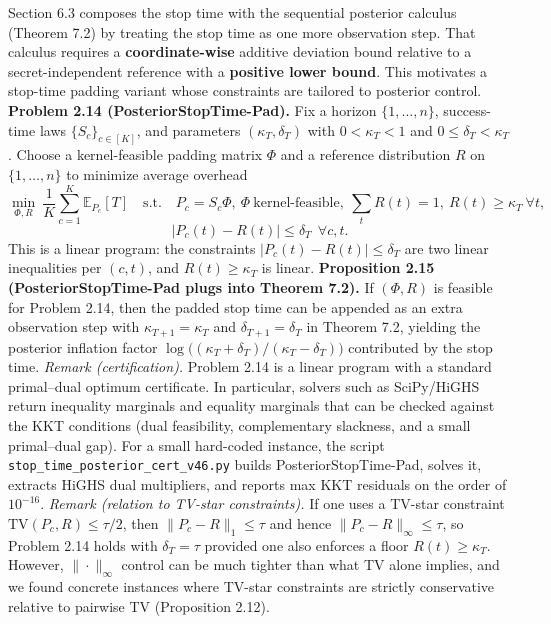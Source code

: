 \documentclass[11pt]{article}
\begin{document}
Section 6.3 composes the stop time with the sequential posterior
calculus (Theorem 7.2) by treating the stop time as one more observation
step. That calculus requires a \textbf{coordinate-wise} additive
deviation bound relative to a secret-independent reference with a
\textbf{positive lower bound}. This motivates a stop-time padding
variant whose constraints are tailored to posterior control.
\textbf{Problem 2.14 (PosteriorStopTime-Pad).} Fix a horizon
\(\{1,\dots,n\}\), success-time laws \(\{S_c\}_{c\in[K]}\), and
parameters \((\kappa_T,\delta_T)\) with \(0<\kappa_T<1\) and
\(0\le \delta_T<\kappa_T\). Choose a kernel-feasible padding matrix
\(\Phi\) and a reference distribution \(R\) on \(\{1,\dots,n\}\) to
minimize average overhead \[
\min_{\Phi,R}\ \frac1K\sum_{c=1}^K \mathbb{E}_{P_c}[T]
\quad\text{s.t.}\quad
P_c = S_c\Phi,\ \Phi\ \text{kernel-feasible},\ \sum_t R(t)=1,\ R(t)\ge \kappa_T\ \forall t,
\] \[
|P_c(t)-R(t)|\le \delta_T\ \ \forall c,t.
\] This is a linear program: the constraints
\(|P_c(t)-R(t)|\le \delta_T\) are two linear inequalities per \((c,t)\),
and \(R(t)\ge \kappa_T\) is linear. \textbf{Proposition 2.15
(PosteriorStopTime-Pad plugs into Theorem 7.2).} If \((\Phi,R)\) is
feasible for Problem 2.14, then the padded stop time can be appended as
an extra observation step with \(\kappa_{T+1}=\kappa_T\) and
\(\delta_{T+1}=\delta_T\) in Theorem 7.2, yielding the posterior
inflation factor
\(\log\!\big((\kappa_T+\delta_T)/(\kappa_T-\delta_T)\big)\) contributed
by the stop time. \emph{Remark (certification).} Problem 2.14 is a
linear program with a standard primal--dual optimum certificate. In
particular, solvers such as SciPy/HiGHS return inequality marginals and
equality marginals that can be checked against the KKT conditions (dual
feasibility, complementary slackness, and a small primal--dual gap). For
a small hard-coded instance, the script
\texttt{stop\_time\_posterior\_cert\_v46.py} builds
PosteriorStopTime-Pad, solves it, extracts HiGHS dual multipliers, and
reports max KKT residuals on the order of \(10^{-16}\). \emph{Remark
(relation to TV-star constraints).} If one uses a TV-star constraint
\(\mathrm{TV}(P_c,R)\le \tau/2\), then \(\|P_c-R\|_1\le \tau\) and hence
\(\|P_c-R\|_\infty\le \tau\), so Problem 2.14 holds with
\(\delta_T=\tau\) provided one also enforces a floor
\(R(t)\ge \kappa_T\). However, \(\|\cdot\|_\infty\) control can be much
tighter than what TV alone implies, and we found concrete instances
where TV-star constraints are strictly conservative relative to pairwise
TV (Proposition 2.12).
\end{document}

